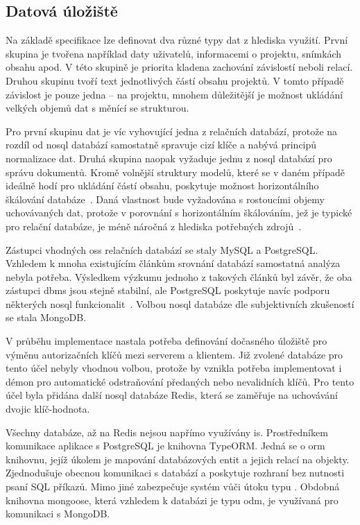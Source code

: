 
\subsection{Datová úložiště}

Na základě specifikace lze definovat dva různé typy dat z hlediska využití. První skupina je tvořena například daty uživatelů, informacemi o projektu, snímkách obsahu apod. V této skupině je priorita kladena zachování závislostí neboli relací. Druhou skupinu tvoří text jednotlivých částí obsahu projektů. V tomto případě závislost je pouze jedna -- na projektu, mnohem důležitější je možnost ukládání velkých objemů dat s měnící se strukturou.

Pro první skupinu dat je víc vyhovující jedna z relačních databází, protože na rozdíl od \gls{nosql} databází samostatně spravuje cizí klíče a nabývá principů normalizace dat. Druhá skupina naopak vyžaduje jednu z \gls{nosql} databází pro správu dokumentů. Kromě volnější struktury modelů, které se v daném případě ideálně hodí pro ukládání částí obsahu, poskytuje možnost horizontálního škálování databáze~\cite{dbScaling}. Daná vlastnost bude vyžadována s rostoucími objemy uchovávaných dat, protože v porovnání s horizontálním škálováním, jež je typické pro relační databáze, je méně náročná z hlediska potřebných zdrojů~\cite{dbScaling}.


Zástupci vhodných \gls{oss} relačních databází se staly MySQL a PostgreSQL. Vzhledem k mnoha existujícím článkům srovnání databází samostatná analýza nebyla potřeba. Výsledkem výzkumu jednoho z takových článků byl závěr, že oba zástupci \gls{dbms} jsou stejně stabilní, ale PostgreSQL poskytuje navíc podporu některých \gls{nosql} funkcionalit~\cite{mysqlPostgres}. Volbou \gls{nosql} databáze dle subjektivních zkušeností se stala MongoDB.


V průběhu implementace nastala potřeba definování dočasného úložiště pro výměnu autorizačních klíčů mezi serverem a klientem. Již zvolené databáze pro tento účel nebyly vhodnou volbou, protože by vznikla potřeba implementovat i démon pro automatické odstraňování předaných nebo nevalidních klíčů. Pro tento účel byla přidána další \gls{nosql} databáze Redis, která se zaměřuje na uchovávání dvojic klíč-hodnota.


Všechny databáze, až na Redis nejsou napřímo využívány \gls{is}. Prostředníkem komunikace aplikace s PostgreSQL je knihovna TypeORM. Jedná se o \gls{orm} knihovnu, jejíž úkolem je mapování databázových entit a jejich relací na objekty. Zjednodušuje obecnou komunikaci s databází a poskytuje rozhraní bez nutnosti psaní SQL příkazů. Mimo jiné zabezpečuje systém vůči útoku typu . Obdobná knihovna mongoose, která vzhledem k databázi je typu \gls{odm}, je využívaná pro komunikaci s MongoDB.


